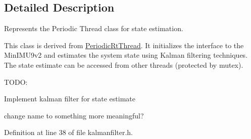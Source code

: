 \subsection{\-Detailed \-Description}
\-Represents the \-Periodic \-Thread class for state estimation. 

\-This class is derived from \hyperlink{class_u_s_u_1_1_periodic_rt_thread}{\-Periodic\-Rt\-Thread}. \-It initializes the interface to the \-Min\-I\-M\-U9v2 and estimates the system state using \-Kalman filtering techniques. \-The state estimate can be accessed from other threads (protected by mutex).

\-T\-O\-D\-O\-:
\begin{DoxyItemize}
\item \-Implement kalman filter for state estimate
\item change name to something more meaningful? 
\end{DoxyItemize}

\-Definition at line 38 of file kalmanfilter.\-h.



